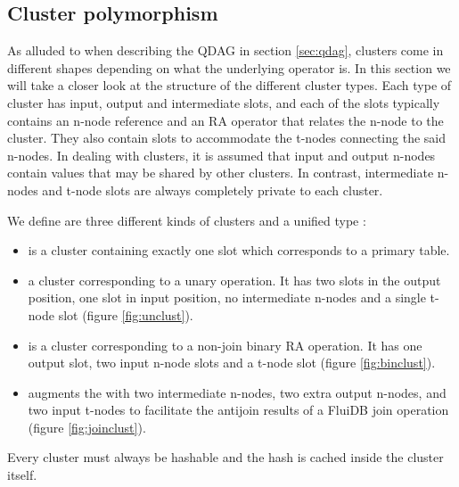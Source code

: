 \subsection{Cluster polymorphism}
\label{sec:cluster_polymorphism}

As alluded to when describing the QDAG in section \ref{sec:qdag},
clusters come in different shapes depending on what the underlying
operator is. In this section we will take a closer look at the
structure of the different cluster types. Each type of cluster has
input, output and intermediate slots, and each of the slots typically
contains an n-node reference and an RA operator that relates the n-node
to the cluster. They also contain slots to accommodate the t-nodes
connecting the said n-nodes. In dealing with clusters, it is assumed that
input and output n-nodes contain values that may be shared by other
clusters. In contrast, intermediate n-nodes and t-node slots are
always completely private to each cluster.

We define are three different kinds of clusters and a unified type
:

\begin{itemize}
\item {} is a cluster containing exactly one slot which
  corresponds to a primary table.
\item {} a cluster corresponding to a unary operation. It
  has two slots in the output position, one slot in input position, no
  intermediate n-nodes and a single t-node slot (figure
  \ref{fig:unclust}).
\item {} is a cluster corresponding to a non-join binary
  RA operation. It has one output slot, two input n-node slots and a
  t-node slot (figure \ref{fig:binclust}).
\item {} augments the  with two
  intermediate n-nodes, two extra output n-nodes, and two input
  t-nodes to facilitate the antijoin results of a FluiDB join
  operation (figure \ref{fig:joinclust}).
\end{itemize}

Every cluster must always be hashable and the hash is cached inside
the cluster itself.

